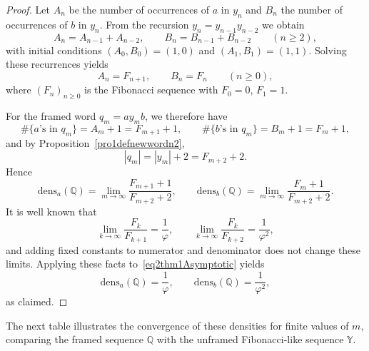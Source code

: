 \documentclass[12pt, a4paper]{article}
\newcommand{\dens}{\mathrm{dens}}
\begin{document}
\begin{proof}
Let $A_n$ be the number of occurrences of $a$ in $y_n$ and $B_n$ the number of occurrences of $b$ in $y_n$. From the recursion $y_n = y_{n-1}y_{n-2}$ we obtain
\[
A_n = A_{n-1} + A_{n-2},\qquad B_n = B_{n-1} + B_{n-2} \qquad (n \ge 2),
\]
with initial conditions $(A_0,B_0) = (1,0)$ and $(A_1,B_1) = (1,1)$. Solving these recurrences yields
\[
A_n = F_{n+1},\qquad B_n = F_n \qquad (n \ge 0),
\]
where $(F_n)_{n\ge 0}$ is the Fibonacci sequence with $F_0=0$, $F_1=1$.

For the framed word $q_m = a y_m b$, we therefore have
\[
\#\{\text{$a$'s in } q_m\} = A_m + 1 = F_{m+1} + 1,\qquad
\#\{\text{$b$'s in } q_m\} = B_m + 1 = F_m + 1,
\]
and by Proposition~\ref{pro1defnewwordn2},
\[
|q_m| = |y_m| + 2 = F_{m+2} + 2.
\]
Hence
\begin{equation}\label{eq2thm1Asymptotic}
\dens_a(\mathbb{Q}) = \lim_{m \to \infty} \frac{F_{m+1} + 1}{F_{m+2} + 2},
\qquad
\dens_b(\mathbb{Q}) = \lim_{m \to \infty} \frac{F_m + 1}{F_{m+2} + 2}.
\end{equation}
It is well known that
\[
\lim_{k \to \infty} \frac{F_k}{F_{k+1}} = \frac{1}{\varphi},
\qquad
\lim_{k \to \infty} \frac{F_k}{F_{k+2}} = \frac{1}{\varphi^2},
\]
and adding fixed constants to numerator and denominator does not change these limits. Applying these facts to~\eqref{eq2thm1Asymptotic} yields
\[
\dens_a(\mathbb{Q}) = \frac{1}{\varphi},\qquad
\dens_b(\mathbb{Q}) = \frac{1}{\varphi^2},
\]
as claimed.
\end{proof}

The next table illustrates the convergence of these densities for finite values of $m$, comparing the framed sequence $\mathbb{Q}$ with the unframed Fibonacci-like sequence $\mathbb{Y}$.
\end{document}
